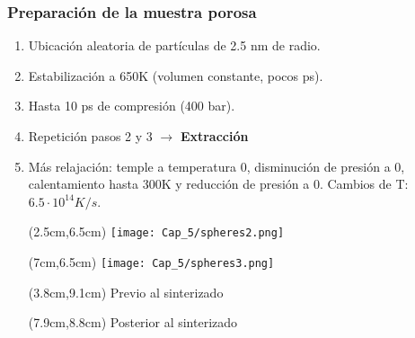 \begin{frame}
    \frametitle{Preparaci\'on de la muestra porosa}
    \vspace{0cm}
    \begin{enumerate}
        \item Ubicaci\'on aleatoria de part\'iculas de 2.5 nm de radio.
        \item Estabilización a 650K (volumen constante, pocos ps). 
        \item Hasta 10 ps de compresi\'on (400 bar).
        \item Repetición pasos 2 y 3 $\rightarrow$ \textbf{Extracción}
        \item M\'as relajaci\'on: temple a temperatura 0, disminución de presi\'on a 0, calentamiento hasta 300K y reducción de presi\'on a 0. Cambios de T: $6.5 \cdot 10^{14} K/s$.
        \begin{textblock*}{3cm}(2.5cm,6.5cm) %
            \texttt{[image: Cap\_5/spheres2.png]}
        \end{textblock*}
        \begin{textblock*}{3cm}(7cm,6.5cm) %
            \texttt{[image: Cap\_5/spheres3.png]}
        \end{textblock*}
        \begin{textblock*}{3cm}(3.8cm,9.1cm)
         \scriptsize{Previo al sinterizado}
        \end{textblock*}
        \begin{textblock*}{3cm}(7.9cm,8.8cm)
         \scriptsize{Posterior al sinterizado}         
        \end{textblock*}
    \end{enumerate}
\end{frame}


